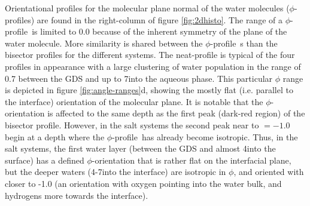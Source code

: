 

\newcommand{\phiprof}{$\phi$-profile~}

Orientational profiles for the molecular plane normal of the water molecules ($\phi$-profiles) are found in the right-column of figure \ref{fig:2dhisto}. The range of a \phiprof is limited to 0.0 because of the inherent symmetry of the plane of the water molecule. More similarity is shared between the \phiprof s than the bisector profiles for the different systems. The neat-\wat profile is typical of the four profiles in appearance with a large clustering of water population in the range of 0.7 between the GDS and up to 7\angs into the aqueous phase. This particular $\phi$ range is depicted in figure \ref{fig:angle-ranges}d, showing the mostly flat (i.e. parallel to the interface) orientation of the molecular plane. It is notable that the $\phi$-orientation is affected to the same depth as the first peak (dark-red region) of the bisector profile. However, in the salt systems the second peak near to \costheta$=-1.0$ begin at a depth where the \phiprof has already become isotropic. Thus, in the salt systems, the first water layer (between the GDS and almost 4\angs into the surface) has a defined $\phi$-orientation that is rather flat on the interfacial plane, but the deeper waters (4-7\angs into the interface) are isotropic in $\phi$, and oriented with \costheta closer to -1.0 (an orientation with oxygen pointing into the water bulk, and hydrogens more towards the interface).

